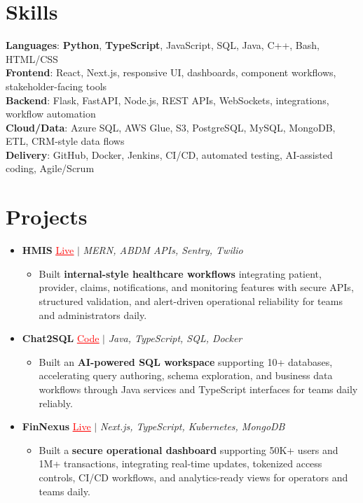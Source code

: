 \documentclass[letterpaper,10pt]{article}
\newcommand{\resumeItem}[1]{\item\small{{#1 \vspace{-2pt}}}}
\newcommand{\resumeProjectHeading}[1]{\item \small #1 \vspace{-2pt}}
\newcommand{\resumeSubHeadingListStart}{\begin{itemize}[leftmargin=0.0in, label={}]}
\newcommand{\resumeSubHeadingListEnd}{\end{itemize}}
\newcommand{\resumeProjItemListStart}{\begin{itemize}[leftmargin=0.15in,label=\textbullet,itemsep=0pt,topsep=0pt,parsep=0pt,partopsep=0pt]}
\newcommand{\resumeProjItemListEnd}{\end{itemize}\vspace{-4pt}}
\begin{document}
\section{Skills}
\begin{itemize}[leftmargin=0.15in, label={}]
\small{\item{
\textbf{Languages}: \textbf{Python}, \textbf{TypeScript}, JavaScript, SQL, Java, C++, Bash, HTML/CSS \\
\textbf{Frontend}: React, Next.js, responsive UI, dashboards, component workflows, stakeholder-facing tools \\
\textbf{Backend}: Flask, FastAPI, Node.js, REST APIs, WebSockets, integrations, workflow automation \\
\textbf{Cloud/Data}: Azure SQL, AWS Glue, S3, PostgreSQL, MySQL, MongoDB, ETL, CRM-style data flows \\
\textbf{Delivery}: GitHub, Docker, Jenkins, CI/CD, automated testing, AI-assisted coding, Agile/Scrum
}}
\end{itemize}
\vspace{-6pt}
\section{Projects}
\resumeSubHeadingListStart
\vspace{2pt}
\resumeProjectHeading{\textbf{HMIS} {\href{https://hims-rouge.vercel.app/}{\textcolor{red}{\underline{Live}}}} $|$ \emph{MERN, ABDM APIs, Sentry, Twilio}}
\resumeProjItemListStart
\resumeItem{Built \textbf{internal-style healthcare workflows} integrating patient, provider, claims, notifications, and monitoring features with secure APIs, structured validation, and alert-driven operational reliability for teams and administrators daily.}
\resumeProjItemListEnd
\vspace{3pt}
\resumeProjectHeading{\textbf{Chat2SQL} {\href{https://github.com/SAHAJ-BHADJA/Chat2SQL}{\textcolor{red}{\underline{Code}}}} $|$ \emph{Java, TypeScript, SQL, Docker}}
\resumeProjItemListStart
\resumeItem{Built an \textbf{AI-powered SQL workspace} supporting 10+ databases, accelerating query authoring, schema exploration, and business data workflows through Java services and TypeScript interfaces for teams daily reliably.}
\resumeProjItemListEnd
\vspace{3pt}
\resumeProjectHeading{\textbf{FinNexus} {\href{https://fin-nexus.vercel.app/}{\textcolor{red}{\underline{Live}}}} $|$ \emph{Next.js, TypeScript, Kubernetes, MongoDB}}
\resumeProjItemListStart
\resumeItem{Built a \textbf{secure operational dashboard} supporting 50K+ users and 1M+ transactions, integrating real-time updates, tokenized access controls, CI/CD workflows, and analytics-ready views for operators and teams daily.}
\resumeProjItemListEnd
\resumeSubHeadingListEnd
\end{document}
